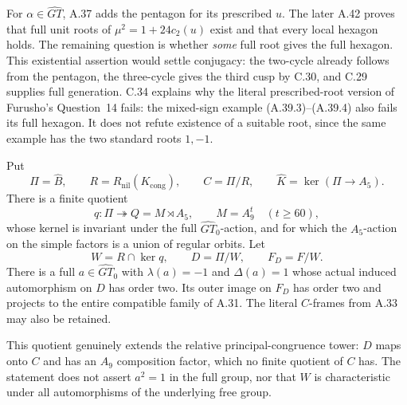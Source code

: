 For \(\alpha\in\widehat{GT}\), A.37 adds the
pentagon for its prescribed \(u\). The later
A.42 proves that full unit roots of
\(\mu^2=1+24c_2(u)\) exist and that every local
hexagon holds. The remaining question is whether
\emph{some} full root gives the full hexagon.
This existential assertion would settle conjugacy:
the two-cycle already follows from the pentagon,
the three-cycle gives the third cusp by C.30,
and C.29 supplies full generation. C.34 explains
why the literal prescribed-root version of
Furusho's Question~14 fails: the mixed-sign
example (A.39.3)--(A.39.4) also fails its full
hexagon. It does not refute existence of a
suitable root, since the same example has the
two standard roots \(1,-1\).

Put
\[
 \Pi=\widehat B,\qquad
 R=R_{\mathrm{nil}}(K_{\mathrm{cong}}),\qquad C=\Pi/R,
 \qquad \widehat K=\ker(\Pi\longrightarrow A_5).
\]
There is a finite quotient
\[
 q:\Pi\twoheadrightarrow Q=M\rtimes A_5,
 \qquad M=A_9^t\quad(t\geq60),
 \tag{A.40.1}
\]
whose kernel is invariant under the full
\(\widehat{GT}_0\)-action, and for which the
\(A_5\)-action on the simple factors is a union of
regular orbits. Let
\[
 W=R\cap\ker q,
 \qquad D=\Pi/W,
 \qquad F_D=F/W.
\]
There is a full \(a\in\widehat{GT}_0\) with
\(\lambda(a)=-1\) and \(\Delta(a)=1\) whose actual
induced automorphism on \(D\) has order two.
Its outer image on \(F_D\) has order two and
projects to the entire compatible family of A.31.
The literal \(C\)-frames from A.33 may also be retained.

This quotient genuinely extends the relative
principal-congruence tower: \(D\) maps onto \(C\)
and has an \(A_9\) composition factor, which no
finite quotient of \(C\) has. The statement does
not assert \(a^2=1\) in the full group, nor that
\(W\) is characteristic under all automorphisms
of the underlying free group.

